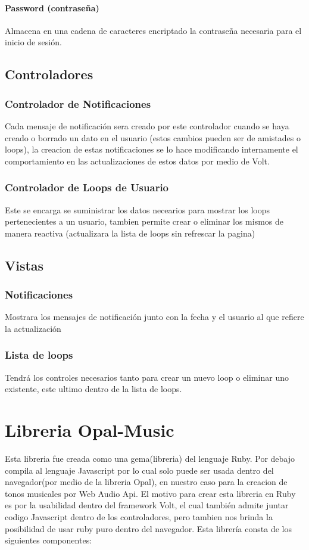 \paragraph{Password (contraseña)}
Almacena en una cadena de caracteres encriptado la contraseña necesaria para
el inicio de sesión.

\subsection{Controladores}
\subsubsection{Controlador de Notificaciones}
Cada mensaje de notificación sera creado por este controlador cuando se haya creado
o borrado un dato en el usuario (estos cambios pueden ser de amistades o loops),
la creacion de estas notificaciones se lo hace modificando internamente el comportamiento en las
actualizaciones de estos datos por medio de Volt.

\subsubsection{Controlador de Loops de Usuario}
Este se encarga se suministrar los datos necearios para mostrar los
loops pertenecientes a un usuario, tambien permite crear o eliminar los
mismos de manera reactiva (actualizara la lista de loops sin refrescar
la pagina)

\subsection{Vistas}
\subsubsection{Notificaciones}
Mostrara los mensajes de notificación junto con la fecha y el usuario al
que refiere la actualización
\subsubsection{Lista de loops}
Tendrá los controles necesarios tanto para crear un nuevo loop o
eliminar uno existente, este ultimo dentro de la lista de loops.

\section{Libreria Opal-Music}
Esta libreria fue creada como una gema(libreria) del lenguaje Ruby. Por
debajo compila al lenguaje Javascript por lo cual solo puede ser usada
dentro del navegador(por medio de la libreria Opal), en nuestro caso
para la creacion de tonos musicales por Web Audio Api. El motivo para
crear esta libreria en Ruby es por la usabilidad dentro del framework
Volt, el cual también admite juntar codigo Javascript dentro de los
controladores, pero tambien nos brinda la posibilidad de usar ruby puro
dentro del navegador. Esta librería consta de los siguientes componentes:

